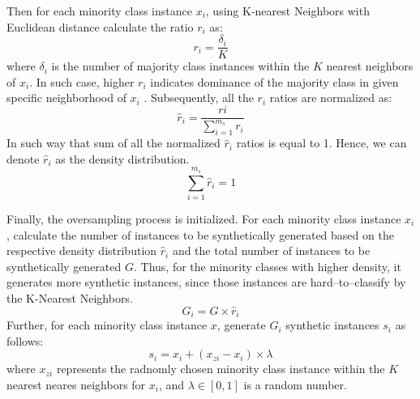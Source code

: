Then for each minority class instance $x_i$, using K-nearest Neighbors with Euclidean distance calculate the ratio $r_i$ as:
\begin{equation}\label{eq}
   r_{i} = \frac{\delta_{i}} {K}
\end{equation}
where $\delta_{i}$ is the number of majority class instances within the $K$ nearest neighbors of $x_i$.
In such case, higher $r_i$ indicates dominance of the majority class in given specific neighborhood of $x_i$ \citep{nian2018introduction}.
Subsequently, all the $r_i$ ratios are normalized as:
\begin{equation}\label{eq}
    \hat{r}_{i} = \frac{r{i}}{\displaystyle\sum_{i=1}^{m_{s}} r_{i}}
\end{equation}
In such way that sum of all the normalized $\hat{r}_i$ ratios is equal to 1. Hence, we can denote $\hat{r}_i$ as the density distribution.
\begin{equation}\label{eq}
    \sum_{i=1}^{m_{s}} \hat{r}_{i} = 1
\end{equation}

Finally, the oversampling process is initialized.
For each minority class instance $x_i$, calculate the number of instances to be synthetically generated based on the respective density distribution $\hat{r}_i$ and the total number of instances to be synthetically generated $G$. Thus, for the minority classes with higher density, it generates more synthetic instances, since those instances are hard--to--classify by the K-Nearest Neighbors.
\begin{equation}\label{eq}
    G_i = G \times \hat{r}_{i}
\end{equation}
Further, for each minority class instance $x$, generate $G_i$ synthetic instances $s_i$ as follows:
\begin{equation}\label{eq}
    s_i = x_i + \left(x_{zi} - x_{i} \right) \times \lambda
\end{equation}
where $x_{zi}$ represents the radnomly chosen minority class instance within the $K$ nearest neares neighbors for $x_i$, and $\lambda \in \left[0,1\right]$ is a random number.

